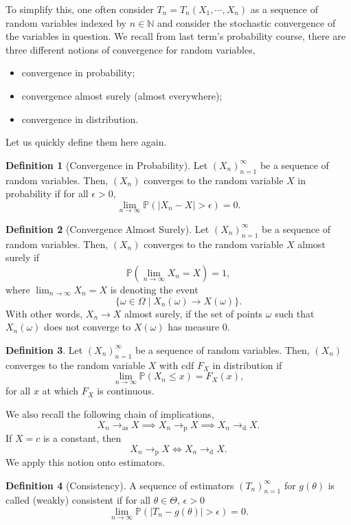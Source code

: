 \documentclass[
]{article}
\theoremstyle{definition}
\theoremstyle{definition}
\newtheorem{definition}{Definition}[section]
\begin{document}
To simplify this, one often consider \(T_n = T_n(X_1, \cdots, X_n)\) as
a sequence of random variables indexed by \(n \in \mathbb{N}\) and
consider the stochastic convergence of the variables in question. We
recall from last term's probability course, there are three different
notions of convergence for random variables,

\begin{itemize}
  \item convergence in probability;
  \item convergence almost surely (almost everywhere);
  \item convergence in distribution.
\end{itemize}

Let us quickly define them here again.

\begin{definition}[Convergence in Probability]
  Let \((X_n)_{n = 1}^\infty\) be a sequence of random variables. Then, \((X_n)\) 
  converges to the random variable \(X\) in probability if for all \(\epsilon > 0\),
  \[\lim_{n \to \infty} \mathbb{P}(|X_n - X| > \epsilon) = 0.\]
\end{definition}
\begin{definition}[Convergence Almost Surely]
  Let \((X_n)_{n = 1}^\infty\) be a sequence of random variables. Then, \((X_n)\) 
  converges to the random variable \(X\) almost surely if 
  \[\mathbb{P}\left(\lim_{n \to \infty} X_n = X\right) = 1,\]
  where \(\lim_{n \to \infty} X_n = X\) is denoting the event 
  \[\{\omega \in \Omega \mid X_n(\omega) \to X(\omega)\}.\]
  With other words, \(X_n \to X\) almost surely, if the set of points \(\omega\) 
  such that \(X_n(\omega)\) does not converge to \(X(\omega)\) has measure 0.
\end{definition}
\begin{definition}
  Let \((X_n)_{n = 1}^\infty\) be a sequence of random variables. Then, \((X_n)\) 
  converges to the random variable \(X\) with cdf \(F_X\) in distribution if 
  \[\lim_{n \to \infty} \mathbb{P}(X_n \le x) = F_X(x),\]
  for all \(x\) at which \(F_X\) is continuous.
\end{definition}

We also recall the following chain of implications,
\[X_n \to_\text{as} X \implies X_n \to_\text{p} X \implies X_n \to_\text{d} X.\]
If \(X = c\) is a constant, then
\[X_n \to_\text{p} X \iff X_n \to_\text{d} X.\] We apply this notion
onto estimators.

\begin{definition}[Consistency]
  A sequence of estimators \((T_n)_{n = 1}^\infty\) for \(g(\theta)\) is called 
  (weakly) consistent if for all \(\theta \in \Theta\), \(\epsilon > 0\)
  \[\lim_{n \to \infty} \mathbb{P}(|T_n - g(\theta)| > \epsilon) = 0.\]
\end{definition}
\end{document}
